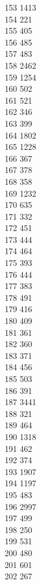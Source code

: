 { 153	1413 \\
 154	221 \\
 155	405 \\
 156	485 \\
 157	483 \\
 158	2462 \\
 159	1254 \\
 160	502 \\
 161	521 \\
 162	346 \\
 163	399 \\
 164	1802 \\
 165	1228 \\
 166	367 \\
 167	378 \\
 168	358 \\
 169	1232 \\
 170	635 \\
 171	332 \\
 172	451 \\
 173	444 \\
 174	464 \\
 175	393 \\
 176	444 \\
 177	383 \\
 178	491 \\
 179	416 \\
 180	409 \\
 181	361 \\
 182	360 \\
 183	371 \\
 184	456 \\
 185	503 \\
 186	391 \\
 187	3441 \\
 188	321 \\
 189	464 \\
 190	1318 \\
 191	462 \\
 192	374 \\
 193	1907 \\
 194	1197 \\
 195	483 \\
 196	2997 \\
 197	499 \\
 198	250 \\
 199	531 \\
 200	480 \\
 201	601 \\
 202	267 \\
}
